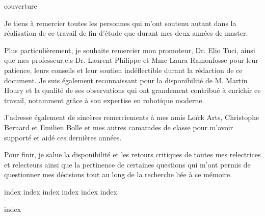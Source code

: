 \documentclass[12pt]{article}
\begin{document}
{couverture}

\thispagestyle{empty}\vspace*{\fill}%
\begin{center}
Je tiens à remercier toutes les personnes qui m'ont soutenu autant dans la réalisation de ce travail de fin d'étude que durant mes deux années de master.

Plus particulièrement, je souhaite remercier mon promoteur, Dr. Elio Tuci, ainsi que mes professeur.e.s Dr. Laurent Philippe et Mme Laura Ramonfosse pour leur patience, leurs conseils et leur soutien indéflectible durant la rédaction de ce document.
Je suis également reconnaissant pour la disponibilité de M. Martin Houry et la qualité de ses observations qui ont grandement contribué à enrichir ce travail, notamment grâce à son expertise en robotique moderne.

J'adresse également de sincères remerciements à mes amis Loïck Arts, Christophe Bernard et Emilien Bolle et mes autres camarades de classe pour m'avoir supporté et aidé ces dernières années.

Pour finir, je salue la disponibilité et les retours critiques de toutes mes relectrices et relecteurs ainsi que la pertinence de certaines questions qui m'ont permis de questionner mes décisions tout au long de la recherche liée à ce mémoire.
\end{center}%
\vfill\cleardoublepage%

\tableofcontents
\listoffigures
\listoftables
\printglossaries %
\vfill\cleardoublepage%

{index}
{index}
{index}
{index}
{index}
{index}

\printbibliography[title={Bibliographie},heading=bibnumbered,prenote={bib-intro}]

{index}
\end{document}
